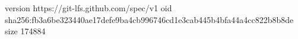 version https://git-lfs.github.com/spec/v1
oid sha256:fb3a6be323440ae17defe9ba4cb996746cd1e3cab445b4bfa44a4cc822b8b8de
size 174884
